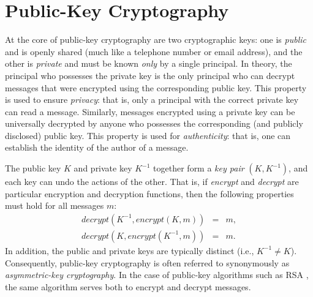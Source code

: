 \section{Public-Key Cryptography}
\label{sec:pubkey-crypto}


At the core of
public-key cryptography are two cryptographic keys: one is
\emph{public} and is
openly shared (much like a telephone number or email address), and the
other is \emph{private} and must be known \emph{only} by a single
principal. In theory, the principal who possesses the private key is
the only principal who can decrypt messages that were encrypted using
the corresponding public key.  This property is used to ensure
\emph{privacy}: that is, only a principal with the
correct private key can read a message. Similarly, messages encrypted
using a private key can be universally decrypted by anyone who
possesses the corresponding (and publicly disclosed) public key.  This
property is used for \emph{authenticity}: that
is, one can establish the identity of the author of a message.

The public key $K$ and private key $K^{-1}$ together form a
\emph{key pair}
$(K,K^{-1})$, and each key can undo the actions of the other.  That
is, if \emph{encrypt} and \emph{decrypt} are particular encryption and
decryption functions, then the following properties must hold for all
messages $m$:
\begin{eqnarray*}
  \mathit{decrypt}(K^{-1},\mathit{encrypt}(K,m)) & = & m, \\
  \mathit{decrypt}(K, \mathit{encrypt}(K^{-1},m)) & = & m. 
\end{eqnarray*}
In addition, the public and private keys are typically distinct (i.e.,
$K^{-1} \neq K$).  Consequently, public-key cryptography is often
referred to synonymously as \emph{asymmetric-key cryptography}.  In the case of
public-key algorithms such as RSA \cite{RSA}, the same algorithm
serves both to encrypt and decrypt messages.

